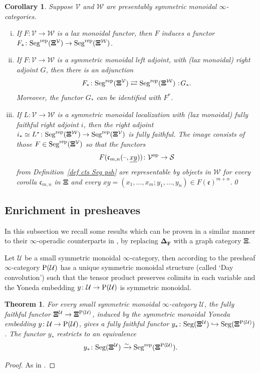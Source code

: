 \documentclass{amsart}
\numberwithin{theorem}{subsection}
\newtheorem{thm}[theorem]{Theorem}
\newtheorem{cor}[theorem]{Corollary}
\theoremstyle{definition}
\providecommand{\op}{\mathrm{op}}
\newcommand{\finsetskel}{\mathbf{F}}
\newcommand{\xS}{\mathcal{S}}
\newcommand{\xU}{\mathcal{U}}
\newcommand{\xV}{\mathcal{V}}
\newcommand{\xW}{\mathcal{W}}
\newcommand{\xfe}{\mathfrak{e}}
\newcommand{\xfc}{\mathfrak{c}}
\newcommand{\Pre}{\name{P}}
\newcommand*\cocolon{%
	\nobreak
	\mskip6mu plus1mu
	\mathpunct{}%
	\nonscript
	\mkern-\thinmuskip
	{:}%
	\mskip2mu
	\relax
}
\newcommand{\icat}{$\infty$-category}
\newcommand{\isoto}{\xrightarrow{\sim}}
\newcommand{\name}[1]{\ensuremath{\text{\textup{#1}}}}
\newcommand{\simp}{\mathbf{\Delta}}
\newcommand{\gc}{\mathbf{\Xi}}
\newcommand{\gcU}{\gc^{\xU}}
\newcommand{\gcPU}{\gc^{\Pre(\xU)}}
\newcommand{\gcV}{\gc^{\xV}}
\newcommand{\Seg}{\name{Seg}}
\newcommand{\blank}{\text{\textendash}}
\newcommand{\Segrep}{\Seg^{\name{rep}}}
\begin{document}
\begin{cor}\label{cor:laxmonftr}
Suppose $\xV$ and $\xW$ are presentably symmetric monoidal $\infty$-categories.
	\begin{enumerate}[(i)]
		\item If $F \colon \xV \to \xW$ is a lax monoidal functor, then $F$ induces a functor $F_{*} \colon \Segrep(\gcV) \to
		\Segrep(\gc^\xW)$.
		\item If $F \colon \xV \to \xW$ is a symmetric monoidal left adjoint, with (lax monoidal) right adjoint $G$, then there is an adjunction
		\[ F_{*} \colon \Segrep(\gcV) \rightleftarrows  \Segrep(\gc^\xW)\cocolon G_{*}.\]
		Moreover, the functor $G_{*}$ can be identified with $F^{*}$.
		\item 
		If $L \colon \xV \to \xW$ is a symmetric monoidal localization with (lax monoidal) fully faithful right adjoint $i$, then the right adjoint $i_{*} \simeq L^{*} \colon \Segrep(\gc^\xW) \to \Segrep(\gcV)$ is fully faithful. 
		The image consists of those $F \in \Segrep(\gcV)$ so that the functors \[ F(\xfc_{m,n}(\blank, \underline{xy}))\colon \xV^\op\to \xS \] from Definition~\ref{def cts Seg psh} are representable by objects in $\xW$ for every corolla $\xfc_{m,n}$ in $\gc$ and every $\underline{xy} = (x_1,\dots,x_m;y_1,\dots,y_n) \in F(\xfe)^{m+n}$.\qed
	\end{enumerate}
\end{cor}

\subsection{Enrichment in presheaves}\label{subsec psh}
In this subsection we recall some results which can be proven in a similar manner to their $\infty$-operadic counterparts in \cite[ and ]{ChuHaugseng}, by replacing $\simp_{\finsetskel}$ with a graph category $\gc$.  

Let $\xU$ be a small symmetric monoidal \icat{}, then according to \cite[Corollary 4.8.1.12]{ha} the presheaf $\infty$-category $\Pre(\xU)$ has a unique symmetric monoidal structure (called `Day convolution') such that the tensor product preserves colimits in each variable and the Yoneda embedding $y\colon \xU \to \Pre(\xU)$ is symmetric monoidal. 


\begin{thm}\label{thm enr psh}
For every small symmetric monoidal \icat{} $\xU$, the fully faithful functor $\gcU \to \gcPU$, induced by the symmetric monoidal Yoneda embedding $y\colon \xU \to \Pre(\xU)$, gives a fully faithful functor $y_{*} \colon \Seg(\gcU) \hookrightarrow \Seg(\gcPU)$.
The functor $y_*$ restricts to an equivalence 
\[ y_*\colon \Seg(\gcU) \isoto \Segrep(\gcPU). \]
\end{thm}
\begin{proof}
	As in \cite[Theorem 2.5.2]{ChuHaugseng}.
\end{proof}
\end{document}
